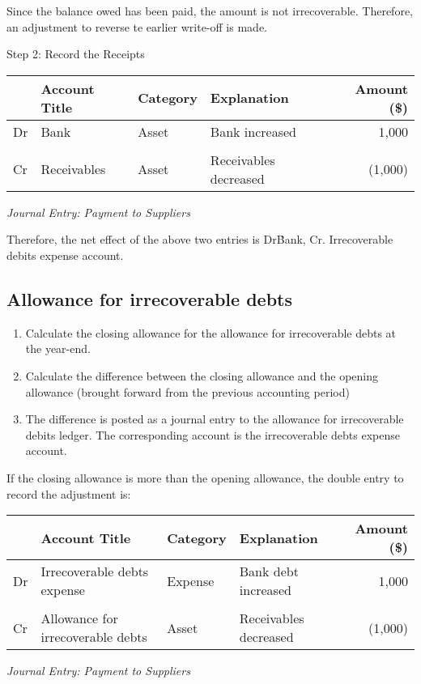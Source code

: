 Since the balance owed has been paid, the amount is not irrecoverable. Therefore, an adjustment to reverse te earlier write-off is made. 

Step 2: Record the Receipts

\begin{center} 
\begin{tabular}{@{} l l l l r @{}}
\toprule
& \textbf{Account Title} & \textbf{Category} & \textbf{Explanation} & \textbf{Amount (\$)} \\
\midrule
Dr & Bank & Asset & Bank increased & 1,000 \\
 & \quad  & \\
Cr & Receivables & Asset & Receivables decreased & (1,000) \\
\bottomrule
\end{tabular}
\end{center}
\vspace{1em}
\textit{Journal Entry: Payment to Suppliers}

Therefore, the net effect of the above two entries is Dr\. Bank, Cr. Irrecoverable debits expense account. 


\subsection{Allowance for irrecoverable debts}

\begin{enumerate} 
    \item Calculate the closing allowance for the allowance for irrecoverable debts at the year-end. 
    \item Calculate the difference between the closing allowance and the opening allowance (brought forward from the previous accounting period) 
    \item The difference is posted as a journal entry to the allowance for irrecoverable debits ledger. The corresponding account is the irrecoverable debts expense account. 
\end{enumerate}

If the closing allowance is more than the opening allowance, the double entry to record the adjustment is: 

\begin{center} 
\begin{tabular}{@{} l l l l r @{}}
\toprule
& \textbf{Account Title} & \textbf{Category} & \textbf{Explanation} & \textbf{Amount (\$)} \\
\midrule
Dr & Irrecoverable debts expense & Expense & Bank debt increased & 1,000 \\
 & \quad  & \\
Cr & Allowance for irrecoverable debts & Asset & Receivables decreased & (1,000) \\
\bottomrule
\end{tabular}
\end{center}
\vspace{1em}
\textit{Journal Entry: Payment to Suppliers}

